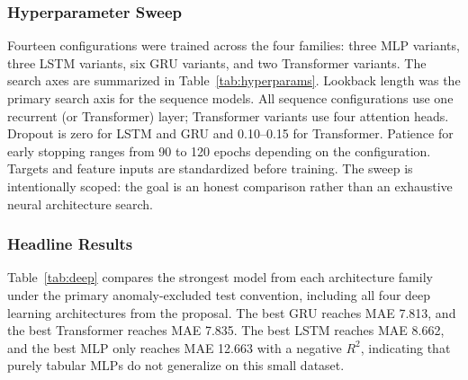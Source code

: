 \documentclass[conference]{IEEEtran}
\begin{document}
\subsubsection{Hyperparameter Sweep}
Fourteen configurations were trained across the four families: three MLP variants, three LSTM variants, six GRU variants, and two Transformer variants. The search axes are summarized in Table~\ref{tab:hyperparams}. Lookback length was the primary search axis for the sequence models. All sequence configurations use one recurrent (or Transformer) layer; Transformer variants use four attention heads. Dropout is zero for LSTM and GRU and 0.10--0.15 for Transformer. Patience for early stopping ranges from 90 to 120 epochs depending on the configuration. Targets and feature inputs are standardized before training. The sweep is intentionally scoped: the goal is an honest comparison rather than an exhaustive neural architecture search.

\begin{table}[t]
\centering
\caption{Deep Learning Hyperparameter Sweep}
\label{tab:hyperparams}
\end{table}

\subsubsection{Headline Results}
Table~\ref{tab:deep} compares the strongest model from each architecture family under the primary anomaly-excluded test convention, including all four deep learning architectures from the proposal. The best GRU reaches MAE 7.813, and the best Transformer reaches MAE 7.835. The best LSTM reaches MAE 8.662, and the best MLP only reaches MAE 12.663 with a negative $R^2$, indicating that purely tabular MLPs do not generalize on this small dataset.
\end{document}
